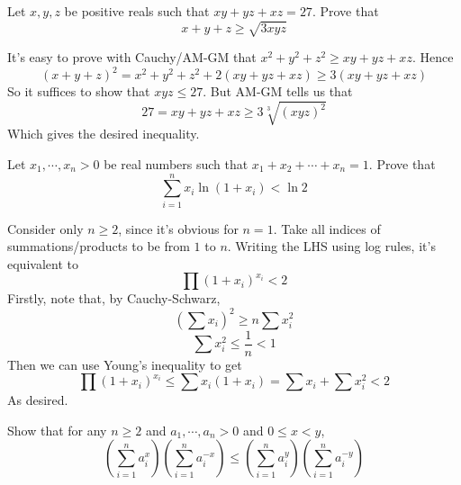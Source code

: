 \documentclass[11pt]{scrartcl}
\begin{document}
\begin{example}
  [Macedonia 2021]
  Let $x,y,z$ be positive reals such that $xy+yz+xz=27$. Prove that
  $$x+y+z\ge \sqrt{3xyz}$$
\end{example}
\begin{soln}
  It's easy to prove with Cauchy/AM-GM that $x^2+y^2+z^2\ge xy+yz+xz$.
  Hence
  $$(x+y+z)^2=x^2+y^2+z^2+2(xy+yz+xz)\ge 3(xy+yz+xz)$$
  So it suffices to show that $xyz\le 27$. But AM-GM tells us that
  $$27=xy+yz+xz\ge 3\sqrt[3]{(xyz)^2}$$
  Which gives the desired inequality.
\end{soln}
\begin{example}
  [Crux 4698]
  Let $x_1,\cdots,x_n>0$ be real numbers such that $x_1+x_2+\cdots+x_n=1$. Prove that
  $$\sum_{i=1}^{n}x_i\ln(1+x_i)<\ln 2$$
\end{example}
\begin{soln}
  Consider only $n\ge 2$, since it's obvious for $n=1$.
  Take all indices of summations/products to be from $1$ to $n$. Writing the LHS using log rules, it's equivalent to
  $$\prod (1+x_i)^{x_i}<2$$
  Firstly, note that, by Cauchy-Schwarz,
  $$\left(\sum x_i\right)^2\ge n\sum x_i^2$$
  $$\sum x_i^2\le \frac{1}{n}<1$$
  Then we can use Young's inequality to get
  $$\prod (1+x_i)^{x_i}\le \sum x_i(1+x_i)=\sum x_i+\sum x_i^2<2$$
  As desired.
\end{soln}
\begin{example}
  Show that for any $n\ge 2$ and $a_1,\cdots, a_n>0$ and $0\le x<y$,
  $$\left(\sum_{i=1}^n a_i^x\right)\left(\sum_{i=1}^n a_i^{-x}\right)\le \left(\sum_{i=1}^n a_i^y\right)\left(\sum_{i=1}^n a_i^{-y}\right)$$
\end{example}
\end{document}

